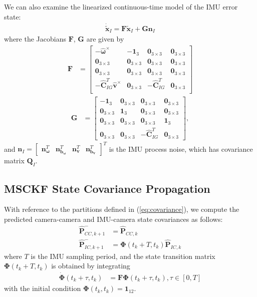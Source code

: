 \documentclass[letterpaper, 10 pt, conference]{ieeeconf}  %
\def\Vec#1{\mathbf{#1}}
\newcommand{\bbm}{\begin{bmatrix}}
\newcommand{\ebm}{\end{bmatrix}}
\begin{document}
We can also examine the linearized continuous-time model of the IMU error state:
\begin{align}
    \dot{\widetilde{\Vec{x}}}_I = \Vec{F}\widetilde{\Vec{x}}_I + \Vec{G}\Vec{n}_I
\end{align}
where the Jacobians $\Vec{F}$, $\Vec{G}$ are given by
\begin{align}
\Vec{F} &= \bbm -\hat{\boldsymbol{\omega}}^\times & -\Vec{1}_3 & \Vec{0}_{3\times3} & \Vec{0}_{3\times3} \\
                    \Vec{0}_{3\times3} & \Vec{0}_{3\times3} & \Vec{0}_{3\times3} & \Vec{0}_{3\times3} \\
                    \Vec{0}_{3\times3} & \Vec{0}_{3\times3} & \Vec{0}_{3\times3} & \Vec{0}_{3\times3} \\
                    -\hat{\Vec{C}}_{I G}^T \hat{\Vec{v}}^\times & \Vec{0}_{3\times3} & -\hat{\Vec{C}}_{I G}^T & \Vec{0}_{3\times3} \\
            \ebm
\end{align}
\begin{align}
\Vec{G} &=  \bbm    -\Vec{1}_3 & \Vec{0}_{3\times3} & \Vec{0}_{3\times3} & \Vec{0}_{3\times3} \\
                                \Vec{0}_{3\times3} & \Vec{1}_3 & \Vec{0}_{3\times3} & \Vec{0}_{3\times3} \\
                                \Vec{0}_{3\times3} & \Vec{0}_{3\times3} & \Vec{0}_{3\times3} & \Vec{1}_3 \\
                                \Vec{0}_{3\times3} & \Vec{0}_{3\times3} & -\hat{\Vec{C}}_{I G}^T & \Vec{0}_{3\times3}
            \ebm ,
\end{align}
and $\Vec{n}_I = \bbm \Vec{n}_{\boldsymbol{\omega}}^T & \Vec{n}_{\Vec{b}_{\boldsymbol{\omega}}}^T & \Vec{n}_{\Vec{v}}^T & \Vec{n}_{\Vec{b}_{\Vec{v}}}^T \ebm^T$ is the IMU process noise, which has covariance matrix $\Vec{Q}_I$.

\subsection{MSCKF State Covariance Propagation}
With reference to the partitions defined in (\ref{eq:covariance}), we compute the predicted camera-camera and IMU-camera state covariances as follows:
\begin{align}
    \hat{\Vec{P}}^-_{CC,k+1} &= \hat{\Vec{P}}_{CC,k} \\
    \hat{\Vec{P}}^-_{IC,k+1} &= \boldsymbol{\Phi}\left(t_k + T, t_k \right) \hat{\Vec{P}}_{IC,k}
\end{align}
where $T$ is the IMU sampling period, and the state transition matrix $\boldsymbol{\Phi}\left(t_k + T, t_k \right)$ is obtained by integrating
\begin{align} \label{eq:statetransition}
    \dot{\boldsymbol{\Phi}}\left(t_k + \tau, t_k \right) &= \Vec{F} \boldsymbol{\Phi}\left(t_k + \tau, t_k \right), \tau\in\left[0,T\right]
\end{align}
with the initial condition $\boldsymbol{\Phi}\left(t_k, t_k \right) = \Vec{1}_{12}$.
\end{document}
